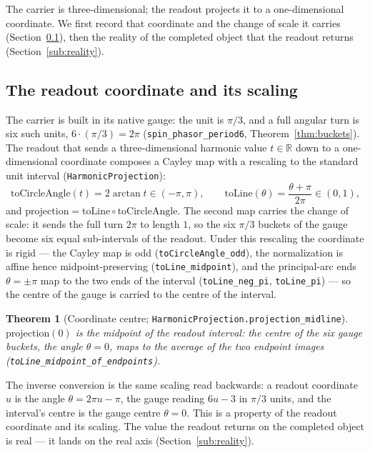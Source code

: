 \documentclass[11pt]{article}
\newtheorem{theorem}[definition]{Theorem}
\newcommand{\R}{\mathbb{R}}
\newcommand{\code}[1]{\texttt{#1}}
\begin{document}
The carrier is three-dimensional; the readout projects it to a one-dimensional coordinate. We first
record that coordinate and the change of scale it carries
(Section~\ref{sub:readout}), then the reality of the completed object that the readout returns
(Section~\ref{sub:reality}).

\subsection{The readout coordinate and its scaling}\label{sub:readout}

The carrier is built in its native gauge: the unit is $\pi/3$, and a full angular turn is six such
units, $6\cdot(\pi/3)=2\pi$ (\code{spin\_phasor\_period6}, Theorem~\ref{thm:buckets}). The readout that
sends a three-dimensional harmonic value $t\in\R$ down to a one-dimensional coordinate composes a
Cayley map \cite{Ahlfors1979} with a rescaling to the standard unit interval (\code{HarmonicProjection}):
\[
  \mathrm{toCircleAngle}(t)=2\arctan t\in(-\pi,\pi),\qquad
  \mathrm{toLine}(\theta)=\frac{\theta+\pi}{2\pi}\in(0,1),
\]
and $\mathrm{projection}=\mathrm{toLine}\circ\mathrm{toCircleAngle}$. The second map carries the change
of scale: it sends the full turn $2\pi$ to length $1$, so the six $\pi/3$ buckets of the gauge become
six equal sub-intervals of the readout. Under this rescaling the coordinate is rigid --- the Cayley
map is odd (\code{toCircleAngle\_odd}), the normalization is affine hence midpoint-preserving
(\code{toLine\_midpoint}), and the principal-arc ends $\theta=\pm\pi$ map to the two ends of the
interval (\code{toLine\_neg\_pi}, \code{toLine\_pi}) --- so the centre of the gauge is carried to the
centre of the interval.

\begin{theorem}[Coordinate centre; \code{HarmonicProjection.projection\_midline}]\label{thm:midline}
$\mathrm{projection}(0)$ is the midpoint of the readout interval: the centre of the six gauge buckets,
the angle $\theta=0$, maps to the average of the two endpoint images
(\code{toLine\_midpoint\_of\_endpoints}).
\end{theorem}

The inverse conversion is the same scaling read backwards: a readout coordinate $u$ is the angle
$\theta=2\pi u-\pi$, the gauge reading $6u-3$ in $\pi/3$ units, and the interval's centre is the gauge
centre $\theta=0$. This is a property of the readout coordinate and its scaling. The value the readout
returns on the completed object is real --- it lands on the real axis (Section~\ref{sub:reality}).
\end{document}
